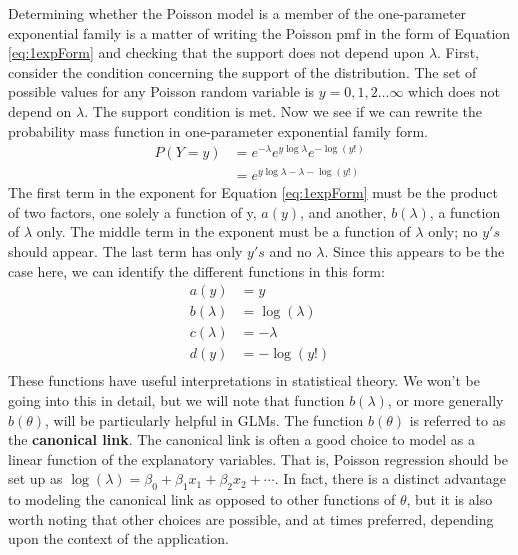 \documentclass[
]{krantz}
\begin{document}
Determining whether the Poisson model is a member of the one-parameter exponential family is a matter of writing the Poisson pmf in the form of Equation \eqref{eq:1expForm} and checking that the support does not depend upon \(\lambda\). First, consider the condition concerning the support of the distribution. The set of possible values for any Poisson random variable is \(y=0,1,2\ldots\infty\) which does not depend on \(\lambda\). The support condition is met. Now we see if we can rewrite the probability mass function in one-parameter exponential family form.
\begin{align}
 P(Y=y)&= {e^{-\lambda}e^{y\log \lambda}e^{-\log (y!)}} \nonumber \\
       &= e^{y\log \lambda-\lambda-\log (y!)}
 \label{eq:opeff}
 \end{align}
The first term in the exponent for Equation \eqref{eq:1expForm} must be the product of two factors, one solely a function of y, \(a(y)\), and another, \(b(\lambda)\), a function of \(\lambda\) only. The middle term in the exponent must be a function of \(\lambda\) only; no \(y's\) should appear. The last term has only \(y's\) and no \(\lambda\). Since this appears to be the case here, we can identify the different functions in this form:
\begin{align}
a(y)&=y \\
b(\lambda)&=\log(\lambda) \\
c(\lambda)&=-\lambda \nonumber \\
d(y)&=-\log (y!) \\
\label{eq:diffunc}
\end{align}
These functions have useful interpretations in statistical theory. We won't be going into this in detail, but we will note that function \(b(\lambda)\), or more generally \(b(\theta)\), will be particularly helpful in GLMs. The function \(b(\theta)\) is referred to as the \textbf{canonical link}. The canonical link is often a good choice to model as a linear function of the explanatory variables. That is, Poisson regression should be set up as \(\log(\lambda)=\beta_0+\beta_1x_1+\beta_2x_2+\cdots\). In fact, there is a distinct advantage to modeling the canonical link as opposed to other functions of \(\theta\), but it is also worth noting that other choices are possible, and at times preferred, depending upon the context of the application.
\end{document}
